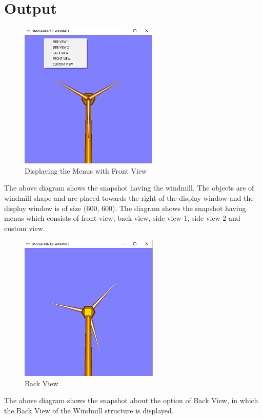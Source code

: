 \documentclass[fontsize=12pt]{article}
\begin{document}
\section{Output}

\begin{figure}[h]
	\centering
  	\includegraphics{F1.PNG}
  	\caption{Displaying the Menus with Front View}
  	\label{fig:Menus}
\end{figure}
The above diagram shows the snapshot having the windmill. The objects are of windmill shape and are placed towards the right of the display window and the display window is of size (600, 600). The diagram shows the snapshot having  menus which consists of front view, back view, side view 1, side view 2 and custom view.\\

\begin{figure}[h]
	\centering
  	\includegraphics{F2.PNG}
  	\caption{Back View}
  	\label{fig:Back}
\end{figure}
The above diagram shows the snapshot about the option of Back View, in which the Back View of the Windmill structure is displayed.\\
\newpage
\end{document}
